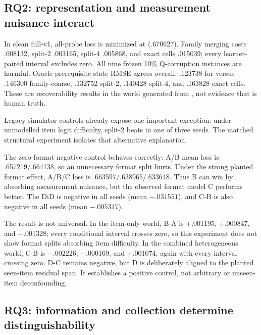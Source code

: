 

\subsection{RQ2: representation and measurement nuisance interact}



In clean full-v1, all-probe loss is minimized at \kstar{} (.670627).  Family
merging costs .008132, split-2 .003165, split-4 .005868, and exact cells
.015039; every learner-paired interval excludes zero.  All nine frozen 10\%
Q-corruption instances are harmful.  Oracle prerequisite-state RMSE agrees
overall: .123738 for \kstar{} versus .146300 family-coarse, .132752 split-2,
.140428 split-4, and .163828 exact cells.  These are recoverability results in
the world generated from \kstar{}, not evidence that \kstar{} is human truth.

Legacy simulator controls already expose one important exception: under
unmodelled item logit difficulty, split-2 beats \kstar{} in one of three seeds.
The matched structural experiment isolates that alternative explanation.



The zero-format negative control behaves correctly: A/B mean loss is
.657219/.664138, so an unnecessary format split hurts.  Under the strong planted
format effect, A/B/C loss is .663597/.638965/.633648.  Thus B can win by
absorbing measurement nuisance, but the observed format model C performs
better.  The DiD is negative in all seeds (mean $-.031551$), and C-B is also
negative in all seeds (mean $-.005317$).

The result is not universal.  In the item-only world, B-A is +.001195,
+.000847, and $-.001328$; every conditional interval crosses zero, so this
experiment does not show format splits absorbing item difficulty.  In the
combined heterogeneous world, C-B is $-.002226$, +.000169, and +.001074, again
with every interval crossing zero.  D-C remains negative, but D is deliberately
aligned to the planted seen-item residual span.  It establishes a positive
control, not arbitrary or unseen-item deconfounding.

\subsection{RQ3: information and collection determine distinguishability}

